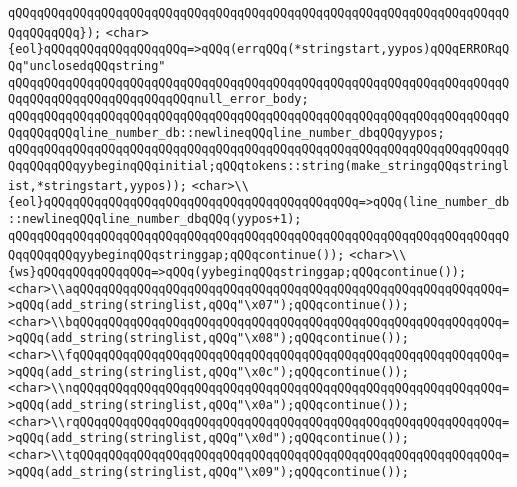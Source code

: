 \verb|qQQqqQQqqQQqqQQqqQQqqQQqqQQqqQQqqQQqqQQqqQQqqQQqqQQqqQQqqQQqqQQqqQQqqQQqqQQqqQQq});|\newline
\verb|<char>{eol}qQQqqQQqqQQqqQQqqQQq=>qQQq(errqQQq(*stringstart,yypos)qQQqERRORqQQq"unclosedqQQqstring"|\newline
\verb|qQQqqQQqqQQqqQQqqQQqqQQqqQQqqQQqqQQqqQQqqQQqqQQqqQQqqQQqqQQqqQQqqQQqqQQqqQQqqQQqqQQqqQQqqQQqqQQqnull_error_body;|\newline
\verb|qQQqqQQqqQQqqQQqqQQqqQQqqQQqqQQqqQQqqQQqqQQqqQQqqQQqqQQqqQQqqQQqqQQqqQQqqQQqqQQqline_number_db::newlineqQQqline_number_dbqQQqyypos;|\newline
\verb|qQQqqQQqqQQqqQQqqQQqqQQqqQQqqQQqqQQqqQQqqQQqqQQqqQQqqQQqqQQqqQQqqQQqqQQqqQQqqQQqyybeginqQQqinitial;qQQqtokens::string(make_stringqQQqstringlist,*stringstart,yypos));|\newline
\verb|<char>\\{eol}qQQqqQQqqQQqqQQqqQQqqQQqqQQqqQQqqQQqqQQqqQQq=>qQQq(line_number_db::newlineqQQqline_number_dbqQQq(yypos+1);|\newline
\verb|qQQqqQQqqQQqqQQqqQQqqQQqqQQqqQQqqQQqqQQqqQQqqQQqqQQqqQQqqQQqqQQqqQQqqQQqqQQqqQQqyybeginqQQqstringgap;qQQqcontinue());|\newline
\verb|<char>\\{ws}qQQqqQQqqQQqqQQq=>qQQq(yybeginqQQqstringgap;qQQqcontinue());|\newline
\verb|<char>\\aqQQqqQQqqQQqqQQqqQQqqQQqqQQqqQQqqQQqqQQqqQQqqQQqqQQqqQQqqQQq=>qQQq(add_string(stringlist,qQQq"\x07");qQQqcontinue());|\newline
\verb|<char>\\bqQQqqQQqqQQqqQQqqQQqqQQqqQQqqQQqqQQqqQQqqQQqqQQqqQQqqQQqqQQq=>qQQq(add_string(stringlist,qQQq"\x08");qQQqcontinue());|\newline
\verb|<char>\\fqQQqqQQqqQQqqQQqqQQqqQQqqQQqqQQqqQQqqQQqqQQqqQQqqQQqqQQqqQQq=>qQQq(add_string(stringlist,qQQq"\x0c");qQQqcontinue());|\newline
\verb|<char>\\nqQQqqQQqqQQqqQQqqQQqqQQqqQQqqQQqqQQqqQQqqQQqqQQqqQQqqQQqqQQq=>qQQq(add_string(stringlist,qQQq"\x0a");qQQqcontinue());|\newline
\verb|<char>\\rqQQqqQQqqQQqqQQqqQQqqQQqqQQqqQQqqQQqqQQqqQQqqQQqqQQqqQQqqQQq=>qQQq(add_string(stringlist,qQQq"\x0d");qQQqcontinue());|\newline
\verb|<char>\\tqQQqqQQqqQQqqQQqqQQqqQQqqQQqqQQqqQQqqQQqqQQqqQQqqQQqqQQqqQQq=>qQQq(add_string(stringlist,qQQq"\x09");qQQqcontinue());|\newline
